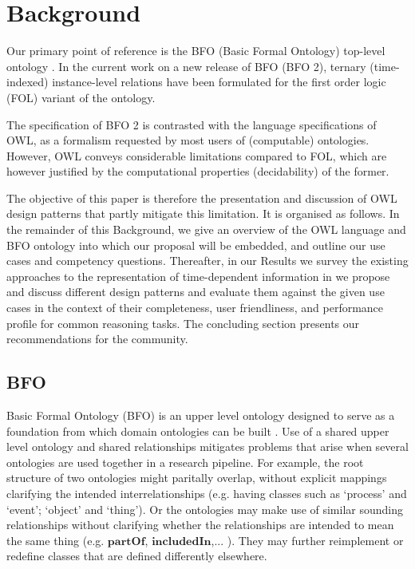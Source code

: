 \documentclass[10pt]{bmc_article}
\newcommand{\mirel}[1]{\ensuremath{\mathrm{\mathbf{#1}}}}
\newenvironment{bmcformat}{\baselineskip20pt\sloppy\setboolean{publ}{false}}{\baselineskip20pt\sloppy}
\begin{document}
\begin{bmcformat}
\section*{Background}



Our primary point of reference is the BFO (Basic Formal Ontology) top-level ontology \cite{BFO2:Graz}. 
In the current work on a new release of BFO (BFO 2), ternary (time-indexed) instance-level relations have
been formulated for the first order logic (FOL) variant of the ontology. 

The specification of BFO 2 is contrasted with the language specifications of OWL, as 
a formalism requested by most users of (computable) ontologies. However, OWL conveys considerable limitations compared to FOL, which are however justified by the computational 
properties (decidability) of the former.    

The objective of this paper is therefore the presentation and discussion of OWL design patterns 
that partly mitigate 
this limitation. It is organised as follows.
In the remainder of this Background, we give an overview of the OWL language and BFO ontology into which our proposal will be embedded, and outline our use cases and competency questions. 
Thereafter, in our Results we survey the existing approaches to the representation of time-dependent information in 
we propose and discuss different design patterns and evaluate them against the given use cases in the context of their completeness, user friendliness, and performance profile for common reasoning tasks.
The concluding section presents our recommendations for the community.

\subsection*{BFO}

Basic Formal Ontology (BFO) is an upper level ontology designed to serve as a foundation from which domain ontologies can be built \cite{BFO2:Graz}. 
Use of a shared upper level ontology and shared relationships mitigates problems that arise when several ontologies are used together in a research pipeline. For example, the root structure of two ontologies might paritally overlap, without explicit mappings clarifying the intended interrelationships (e.g. having classes such as `process' and `event'; `object' and `thing'). Or the ontologies may make use of similar sounding relationships without clarifying whether the relationships are intended to mean the same thing (e.g. $\mirel{partOf}$, $\mirel{includedIn}$,... ). They may further reimplement or redefine classes that are defined differently elsewhere.


\end{bmcformat}
\end{document}
